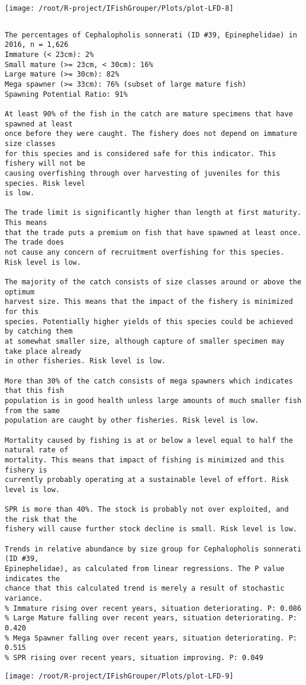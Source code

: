 \documentclass{report}\usepackage[]{graphicx}\usepackage[]{color}
\makeatletter
\def\maxwidth{ %
  \ifdim\Gin@nat@width>\linewidth
    \linewidth
  \else
    \Gin@nat@width
  \fi
}
\newenvironment{kframe}{%
 \def\at@end@of@kframe{}%
 \ifinner\ifhmode%
  \def\at@end@of@kframe{\end{minipage}}%
  \begin{minipage}{\columnwidth}%
 \fi\fi%
 \def\FrameCommand##1{\hskip\@totalleftmargin \hskip-\fboxsep
 \colorbox{shadecolor}{##1}\hskip-\fboxsep
     \hskip-\linewidth \hskip-\@totalleftmargin \hskip\columnwidth}%
 \MakeFramed {\advance\hsize-\width
   \@totalleftmargin\z@ \linewidth\hsize
   \@setminipage}}%
 {\par\unskip\endMakeFramed%
 \at@end@of@kframe}
\newenvironment{knitrout}{}{} %
\makeatother
\begin{document}
\begin{knitrout}
\texttt{[image: /root/R-project/IFishGrouper/Plots/plot-LFD-8]} 
\begin{kframe}\begin{verbatim}
\end{verbatim}
\end{kframe}
\clearpage
\newpage
\begin{kframe}\begin{verbatim}The percentages of Cephalopholis sonnerati (ID #39, Epinephelidae) in 2016, n = 1,626
Immature (< 23cm): 2%
Small mature (>= 23cm, < 30cm): 16%
Large mature (>= 30cm): 82%
Mega spawner (>= 33cm): 76% (subset of large mature fish)
Spawning Potential Ratio: 91%
 
At least 90% of the fish in the catch are mature specimens that have spawned at least
once before they were caught. The fishery does not depend on immature size classes
for this species and is considered safe for this indicator. This fishery will not be
causing overfishing through over harvesting of juveniles for this species. Risk level
is low.

The trade limit is significantly higher than length at first maturity.  This means
that the trade puts a premium on fish that have spawned at least once. The trade does
not cause any concern of recruitment overfishing for this species. Risk level is low.

The majority of the catch consists of size classes around or above the optimum
harvest size. This means that the impact of the fishery is minimized for this
species. Potentially higher yields of this species could be achieved by catching them
at somewhat smaller size, although capture of smaller specimen may take place already
in other fisheries. Risk level is low.

More than 30% of the catch consists of mega spawners which indicates that this fish
population is in good health unless large amounts of much smaller fish from the same
population are caught by other fisheries. Risk level is low.
 
Mortality caused by fishing is at or below a level equal to half the natural rate of
mortality. This means that impact of fishing is minimized and this fishery is
currently probably operating at a sustainable level of effort. Risk level is low.
 
SPR is more than 40%. The stock is probably not over exploited, and the risk that the
fishery will cause further stock decline is small. Risk level is low.
 
Trends in relative abundance by size group for Cephalopholis sonnerati (ID #39,
Epinephelidae), as calculated from linear regressions. The P value indicates the
chance that this calculated trend is merely a result of stochastic variance.
% Immature rising over recent years, situation deteriorating. P: 0.086
% Large Mature falling over recent years, situation deteriorating. P: 0.420
% Mega Spawner falling over recent years, situation deteriorating. P: 0.515
% SPR rising over recent years, situation improving. P: 0.049
\end{verbatim}
\end{kframe}
\texttt{[image: /root/R-project/IFishGrouper/Plots/plot-LFD-9]} 


\end{knitrout}
\end{document}
